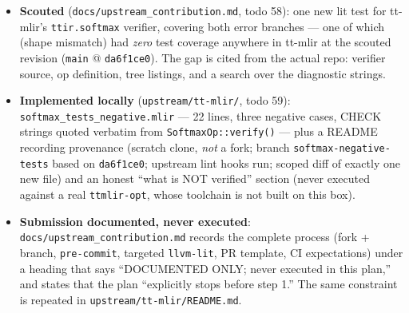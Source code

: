 \begin{itemize}[nosep]
  \item \textbf{Scouted} (\texttt{docs/upstream\_contribution.md}, todo 58):
        one new lit test for tt-mlir's \texttt{ttir.softmax} verifier,
        covering both error branches --- one of which (shape mismatch) had
        \emph{zero} test coverage anywhere in tt-mlir at the scouted
        revision (\texttt{main} @ \texttt{da6f1ce0}). The gap is cited from
        the actual repo: verifier source, op definition, tree listings, and
        a search over the diagnostic strings.
  \item \textbf{Implemented locally} (\texttt{upstream/tt-mlir/}, todo 59):
        \texttt{softmax\_tests\_negative.mlir} --- 22 lines, three negative
        cases, CHECK strings quoted verbatim from \texttt{SoftmaxOp::verify()}
        --- plus a README recording provenance (scratch clone, \emph{not} a
        fork; branch \texttt{softmax-negative-tests} based on
        \texttt{da6f1ce0}; upstream lint hooks run; scoped diff of exactly
        one new file) and an honest ``what is NOT verified'' section (never
        executed against a real \texttt{ttmlir-opt}, whose toolchain is not
        built on this box).
  \item \textbf{Submission documented, never executed}:
        \texttt{docs/upstream\_contribution.md} records the complete process
        (fork + branch, \texttt{pre-commit}, targeted \texttt{llvm-lit},
        PR template, CI expectations) under a heading that says
        ``DOCUMENTED ONLY; never executed in this plan,'' and states that
        the plan ``explicitly stops before step 1.'' The same constraint is
        repeated in \texttt{upstream/tt-mlir/README.md}.
\end{itemize}
